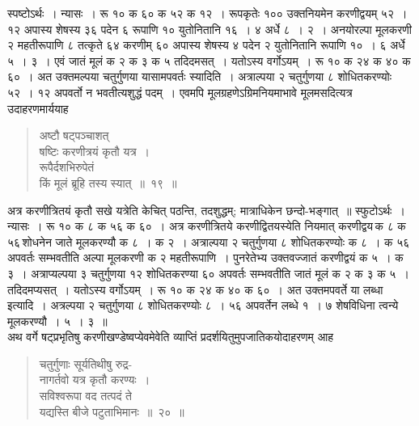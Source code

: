 \documentclass[11pt, openany]{book}
\begin{document}
 स्पष्टोऽर्थः~। न्यासः~। रू १० क ६० क ५२ क १२~। रूपकृतेः 
१०० उक्तनियमेन करणीद्वयम् ५२~। १२ अपास्य शेषस्य ३६ पदेन ६ 
रूपाणि १० युतोनितानि १६~। ४ अर्धे ८~। २~। अनयोरल्पा मूलकरणी २ महतीरूपाणि ८ तत्कृते ६४ करणीम् ६० अपास्य शेषस्य ४ 
पदेन २ युतोनितानि रूपाणि १०~। ६ अर्धे ५~। ३~। एवं जातं 
मूलं क २ क ३ क ५ तदिदमसत्~। यतोऽस्य वर्गोऽयम्~। रू १० 
क २४ क ४० क ६०~। अत उक्तमल्पया चतुर्गुणया यासामपवर्तः 
स्यादिति~। अत्राल्पया २ चतुर्गुणया ८ शोधितकरण्योः ५२~। १२ अपवर्तो 
न भवतीत्यशुद्धं पदम्~।
\newpage
 एवमपि मूलग्रहणेऽग्रिमनियमाभावे मूलमसदित्यत्र उदाहरणमार्ययाह\textendash 
\begin{quote}
    \ex
     अष्टौ षट्पञ्चाशत् \\

\vspace{-7mm}
\hspace{1cm} षष्टिः करणीत्रयं कृतौ यत्र~। \\

\vspace{-7mm}
 रूपैर्दशभिरुपेतं \\

\vspace{-7mm}
\hspace{1cm} किं मूलं ब्रूहि तस्य स्यात्~॥~१९~॥ 
\end{quote}

 अत्र करणीत्रितयं कृतौ सखे यत्रेति केचित् पठन्ति, तदशुद्धम्; मात्राधिकेन छन्दो-भङ्गात्~॥ स्फुटोऽर्थः~। न्यासः~। रू १० क ८ क ५६ क ६०~। 
अत्र करणीत्रितये करणीद्वितयस्येति नियमात् करणीद्वय\textendash \,क ८ क ५६\textendash \,शोधनेन जाते मूलकरण्यौ क ८~। क २~। अत्राल्पया २ चतुर्गुणया ८ शोधितकरण्योः क ८~। क ५६ अपवर्तः सम्भवतीति अल्पा मूलकरणी 
क २ महतीरूपाणि~। पुनरेतेभ्य उक्तवज्जातं करणीद्वयं क ५~। क ३~। 
अत्राप्यल्पया ३ चतुर्गुणया १२ शोधितकरण्या ६० अपवर्तः सम्भवतीति जातं 
मूलं क २ क ३ क ५~। तदिदमप्यसत्~। यतोऽस्य वर्गोऽयम्~। रू १० 
क २४ क ४० क ६०~। अत उक्तमपवर्ते या लब्धा इत्यादि~। 
अत्रल्पया २ चतुर्गुणया ८ शोधितकरण्योः ८~। ५६ अपवर्तेन लब्धे १~। ७ 
शेषविधिना त्वन्ये मूलकरण्यौ~। ५~। ३~॥ \\

\vspace{-3mm}
 अथ वर्गे षट्प्रभृतिषु करणीखण्डेष्वप्येवमेवेति व्याप्तिं प्रदर्शयितुमुपजातिकयोदाहरणम् आह\textendash  
\begin{quote}
    \ex
     चतुर्गुणाः सूर्यतिथीषु रुद्र- \\

\vspace{-7mm}
\hspace{1cm} नागर्तवो यत्र कृतौ करण्यः~। \\

\vspace{-7mm}
 सविश्वरूपा वद तत्पदं ते \\

\vspace{-7mm}
\hspace{1cm} यद्यस्ति बीजे पटुताभिमानः~॥~२०~॥ 
\end{quote}
\end{document}
